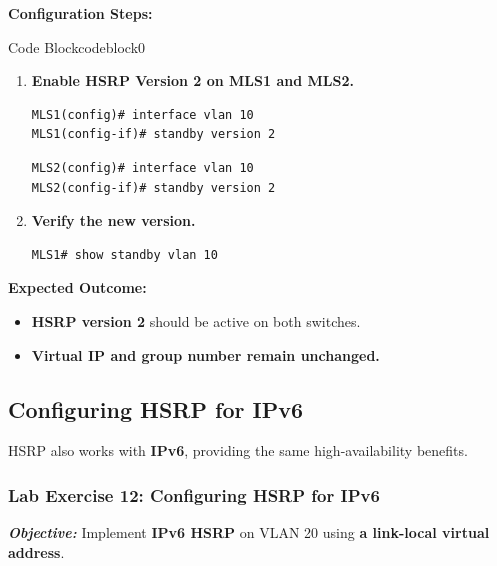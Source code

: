 \documentclass[a4paper]{book}
\begin{document}
\vspace{1.5em}

\textbf{Configuration Steps:}


\vspace{1.5em}


\begin{ocg}{Code Block}{codeblock}{0}

\vspace{0.5cm}
\begin{enumerate}
\item \textbf{Enable HSRP Version 2 on MLS1 and MLS2.}
\begin{lstlisting}
MLS1(config)# interface vlan 10
MLS1(config-if)# standby version 2
\end{lstlisting}
\begin{lstlisting}
MLS2(config)# interface vlan 10
MLS2(config-if)# standby version 2
\end{lstlisting}

\item \textbf{Verify the new version.}
\begin{lstlisting}
MLS1# show standby vlan 10
\end{lstlisting}
\end{enumerate}
\end{ocg}


\textbf{Expected Outcome:}
\begin{itemize}
\item \textbf{HSRP version 2} should be active on both switches.
\item \textbf{Virtual IP and group number remain unchanged.}
\end{itemize}

\subsection{Configuring HSRP for IPv6}
HSRP also works with \textbf{IPv6}, providing the same high-availability benefits.

\subsubsection{Lab Exercise 12: Configuring HSRP for IPv6}
\textbf{\textit{Objective:}} Implement \textbf{IPv6 HSRP} on VLAN 20 using 
\textbf{a link-local virtual address}.
\end{document}
